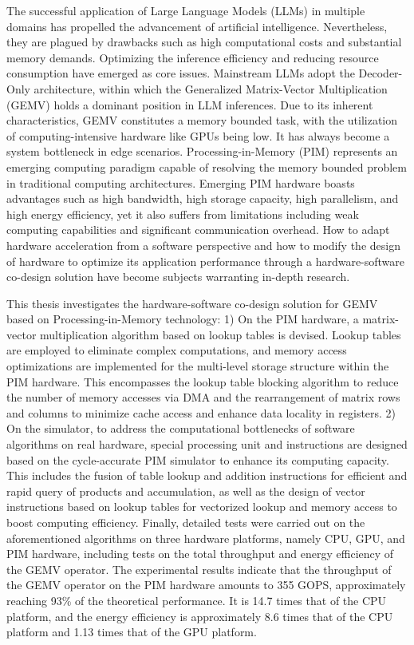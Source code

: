 \begin{abstracten}
    The successful application of Large Language Models (LLMs) in multiple domains has propelled the advancement of artificial intelligence. Nevertheless, they are plagued by drawbacks such as high computational costs and substantial memory demands. Optimizing the inference efficiency and reducing resource consumption have emerged as core issues. Mainstream LLMs adopt the Decoder-Only architecture, within which the Generalized Matrix-Vector Multiplication (GEMV) holds a dominant position in LLM inferences. Due to its inherent characteristics, GEMV constitutes a memory bounded task, with the utilization of computing-intensive hardware like GPUs being low. It has always become a system bottleneck in edge scenarios. Processing-in-Memory (PIM) represents an emerging computing paradigm capable of resolving the memory bounded problem in traditional computing architectures. Emerging PIM hardware boasts advantages such as high bandwidth, high storage capacity, high parallelism, and high energy efficiency, yet it also suffers from limitations including weak computing capabilities and significant communication overhead. How to adapt hardware acceleration from a software perspective and how to modify the design of hardware to optimize its application performance through a hardware-software co-design solution have become subjects warranting in-depth research.

    This thesis investigates the hardware-software co-design solution for GEMV based on Processing-in-Memory technology: 1) On the PIM hardware, a matrix-vector multiplication algorithm based on lookup tables is devised. Lookup tables are employed to eliminate complex computations, and memory access optimizations are implemented for the multi-level storage structure within the PIM hardware. This encompasses the lookup table blocking algorithm to reduce the number of memory accesses via DMA and the rearrangement of matrix rows and columns to minimize cache access and enhance data locality in registers. 2) On the simulator, to address the computational bottlenecks of software algorithms on real hardware, special processing unit and instructions are designed based on the cycle-accurate PIM simulator to enhance its computing capacity. This includes the fusion of table lookup and addition instructions for efficient and rapid query of products and accumulation, as well as the design of vector instructions based on lookup tables for vectorized lookup and memory access to boost computing efficiency. Finally, detailed tests were carried out on the aforementioned algorithms on three hardware platforms, namely CPU, GPU, and PIM hardware, including tests on the total throughput and energy efficiency of the GEMV operator. The experimental results indicate that the throughput of the GEMV operator on the PIM hardware amounts to 355 GOPS, approximately reaching 93\% of the theoretical performance. It is 14.7 times that of the CPU platform, and the energy efficiency is approximately 8.6 times that of the CPU platform and 1.13 times that of the GPU platform.
\end{abstracten}
